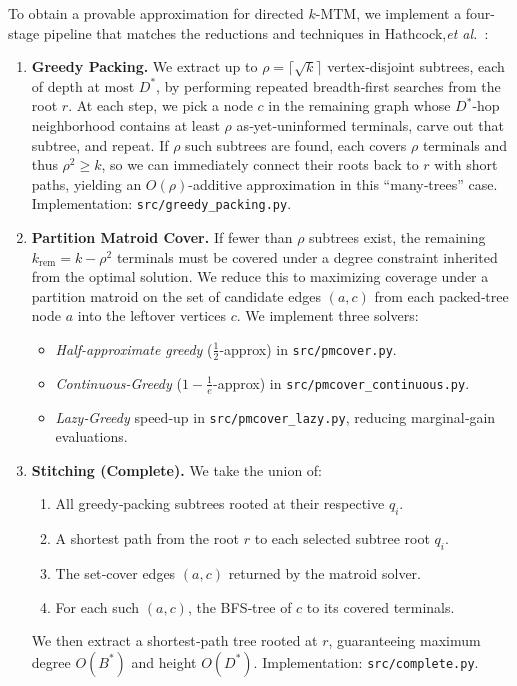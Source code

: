 \documentclass[12pt]{article}
\begin{document}
To obtain a provable approximation for directed \(k\)-MTM, we implement a four-stage pipeline that matches the reductions and techniques in Hathcock,\emph{et al.}~\cite{Hathcock2024}:

\begin{enumerate}
  \item \textbf{Greedy Packing.}  
    We extract up to \(\rho = \lceil\sqrt{k}\rceil\) vertex‐disjoint subtrees, each of depth at most \(D^*\), by performing repeated breadth‐first searches from the root \(r\).  At each step, we pick a node \(c\) in the remaining graph whose \(D^*\)-hop neighborhood contains at least \(\rho\) as‐yet‐uninformed terminals, carve out that subtree, and repeat.  
    If \(\rho\) such subtrees are found, each covers \(\rho\) terminals and thus \(\rho^2\ge k\), so we can immediately connect their roots back to \(r\) with short paths, yielding an \(O(\rho)\)-additive approximation in this “many‐trees” case.  
    Implementation: \texttt{src/greedy\_packing.py}.

  \item \textbf{Partition Matroid Cover.}  
    If fewer than \(\rho\) subtrees exist, the remaining \(k_{\mathrm{rem}}=k-\rho^2\) terminals must be covered under a degree constraint inherited from the optimal solution.  We reduce this to maximizing coverage under a partition matroid on the set of candidate edges \((a,c)\) from each packed‐tree node \(a\) into the leftover vertices \(c\).  We implement three solvers:
    \begin{itemize}
      \item \emph{Half-approximate greedy} (\(\tfrac12\)-approx) in \texttt{src/pmcover.py}.  
      \item \emph{Continuous‐Greedy} (\(1-\tfrac1e\)-approx) in \texttt{src/pmcover\_continuous.py}.  
      \item \emph{Lazy‐Greedy} speed‐up in \texttt{src/pmcover\_lazy.py}, reducing marginal‐gain evaluations.  
    \end{itemize}

  \item \textbf{Stitching (Complete).}  
    We take the union of:
    \begin{enumerate}
      \item All greedy‐packing subtrees rooted at their respective \(q_i\).  
      \item A shortest path from the root \(r\) to each selected subtree root \(q_i\).  
      \item The set‐cover edges \((a,c)\) returned by the matroid solver.  
      \item For each such \((a,c)\), the BFS‐tree of \(c\) to its covered terminals.  
    \end{enumerate}
    We then extract a shortest‐path tree rooted at \(r\), guaranteeing maximum degree \(O(B^*)\) and height \(O(D^*)\).  
    Implementation: \texttt{src/complete.py}.


\end{enumerate}
\end{document}
